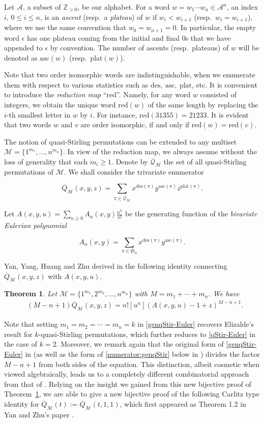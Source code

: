 \documentclass[11pt,reqno]{amsart}
\numberwithin{equation}{section}
\theoremstyle{plain}
\newtheorem{theorem}{Theorem}[section]
\theoremstyle{definition}
\newcommand{\Z}{\mathbb{Z}}
\newcommand{\s}{\mathfrak{S}}
\newcommand{\bQ}{\overline{\mathcal{Q}}}
\newcommand{\A}{\mathcal{A}}
\newcommand{\M}{\mathcal{M}}
\def\red{\mathrm{red}}
\def\des{\mathrm{des}}
\def\asc{\mathrm{asc}}
\def\plat{\mathrm{plat}}
\begin{document}
Let $\A$, a subset of $\Z_{>0}$, be our alphabet. For a word $w=w_1\cdots w_n\in\A^n$, an index $i$, $0\le i\le n$, is an {\em ascent} (resp.~a {\em plateau}) of $w$ if $w_i<w_{i+1}$ (resp.~$w_i=w_{i+1}$), where we use the same convention that $w_0=w_{n+1}=0$. In particular, the empty word $\epsilon$ has one plateau coming from the initial and final $0$s that we have appended to $\epsilon$ by convention. The number of ascents (resp.~plateaus) of $w$ will be denoted as $\asc(w)$ (resp.~$\plat(w)$). 

Note that two order isomorphic words are indistinguishable, when we enumerate them with respect to various statistics such as $\des,~\asc,~\plat$, etc. It is convenient to introduce the {\em reduction map} ``$\red$''. Namely, for any word $w$ consisted of integers, we obtain the unique word $\red(w)$ of the same length by replacing the $i$-th smallest letter in $w$ by $i$. For instance, $\red(31355)=21233$. It is evident that two words $w$ and $v$ are order isomorphic, if and only if $\red(w)=\red(v)$.

The notion of quasi-Stirling permutations can be extended to any multiset $\M=\{1^{m_1},\ldots,n^{m_n}\}$. In view of the reduction map, we always assume without the loss of generality that each $m_i\ge 1$. Denote by $\bQ_{\M}$ the set of all quasi-Stirling permutations of $\M$. 
We shall consider the trivariate enumerator 

$$\overline{Q}_{\M}(x,y,z)=\sum_{\pi\in\bQ_{\M}}x^{\des(\pi)}y^{\asc(\pi)}z^{\plat(\pi)}.$$

Let $A(x,y,u)=\sum_{n\ge 0}A_n(x,y)\frac{u^n}{n!}$ be the generating function of the {\em bivariate Eulerian polynomial}

$$A_n(x,y)=\sum_{\pi\in\s_n}x^{\des(\pi)}y^{\asc(\pi)}.$$

Yan, Yang, Huang and Zhu derived in \cite[Coro.~1.5]{YYHZ} the following identity connecting $\overline{Q}_{\M}(x,y,z)$ with $A(x,y,u)$. 

\begin{theorem}\label{thm:YYHZ}
Let $\M=\{1^{m_1},2^{m_2},\ldots,n^{m_n}\}$ with $M=m_1+\cdots+m_n$. We have
\begin{align}\label{genqStir-Euler}
& (M-n+1)\overline{Q}_{\M}(x,y,z)=n![u^n](A(x,y,u)-1+z)^{M-n+1}.
\end{align}
\end{theorem}

Note that setting $m_1=m_2=\cdots=m_n=k$ in \eqref{genqStir-Euler} recovers Elizalde's result \cite[Eq.~(22)]{Eli} for $k$-quasi-Stirling permutations, which further reduces to \eqref{qStir-Euler} in the case of $k=2$. Moreover, we remark again that the original form of \eqref{genqStir-Euler} in \cite{YYHZ} (as well as the form of \eqref{numerator:genqStir} below in \cite{YZ}) divides the factor $M-n+1$ from both sides of the equation. This distinction, albeit cosmetic when viewed algebraically, leads us to a completely different combinatorial approach from that of \cite{YYHZ}. Relying on the insight we gained from this new bijective proof of Theorem~\ref{thm:YYHZ}, we are able to give a new bijective proof of the following Carlitz type identity for $\overline{Q}_{\M}(t):=\overline{Q}_{\M}(t,1,1)$, which first appeared as Theorem 1.2 in Yan and Zhu's paper \cite{YZ}.
\end{document}
